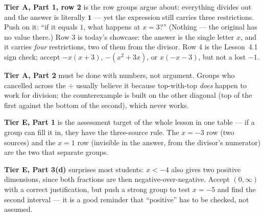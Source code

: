 \documentclass[10pt]{article}
\begin{document}
\begin{teachernote}
\textbf{Tier A, Part 1, row 2} is the row groups argue about: everything divides out and the answer is
literally $\mathbf{1}$ --- yet the expression still carries three restrictions. Push on it: ``if it
equals $1$, what happens at $x=3$?'' (Nothing --- the original has no value there.) Row 3 is today's
showcase: the answer is the single letter $x$, and it carries \emph{four} restrictions, two of them
from the divisor. Row 4 is the Lesson~4.1 sign check; accept $-x(x+3)$, $-(x^2+3x)$, or
$x(-x-3)$, but not a lost $-1$.

\vspace{3pt}
\textbf{Tier A, Part 2} must be done with numbers, not argument. Groups who cancelled across the $\div$
usually believe it because top-with-top \emph{does} happen to work for division; the counterexample is
built on the other diagonal (top of the first against the bottom of the second), which never works.

\vspace{3pt}
\textbf{Tier E, Part 1} is the assessment target of the whole lesson in one table --- if a group can
fill it in, they have the three-source rule. The $x=-3$ row (two sources) and the $x=1$ row (invisible
in the answer, from the divisor's numerator) are the two that separate groups.

\vspace{3pt}
\textbf{Tier E, Part 3(d)} surprises most students: $x<-4$ also gives two positive dimensions, since
both fractions are then negative-over-negative. Accept $(0,\infty)$ with a correct justification, but
push a strong group to test $x=-5$ and find the second interval --- it is a good reminder that
``positive'' has to be checked, not assumed.
\end{teachernote}
\end{document}
